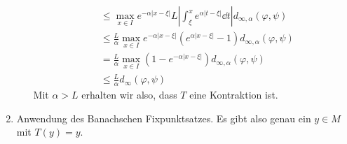 \begin{beweis}
\begin{enumerate}
\begin{itemize}
\begin{align*}
	        &\leq\max_{x\in I}e^{-\alpha|x-\xi|}L\left|\int_{\xi}^{x}e^{\alpha|t-\xi|}\dd t\right|d_{\infty,\alpha}(\varphi,\psi)\\
	        &\leq\frac{L}{\alpha}\max_{x\in I}e^{-\alpha|x-\xi|}(e^{\alpha|x-\xi|}-1)d_{\infty,\alpha}(\varphi,\psi)\\
	        &=\frac{L}{\alpha}\max_{x\in I}(1-e^{-\alpha|x-\xi|})d_{\infty,\alpha}(\varphi,\psi)\\
	        &\leq\frac{L}{\alpha}d_{\infty}(\varphi,\psi)
	        \end{align*}
	        Mit $ \alpha>L $ erhalten wir also, dass $ T $ eine Kontraktion ist.
	     \end{itemize}
	     \item Anwendung des Banachschen Fixpunktsatzes. Es gibt also genau ein $ y\in M $ mit $ T(y)=y $.
	\end{enumerate}
\end{beweis}
